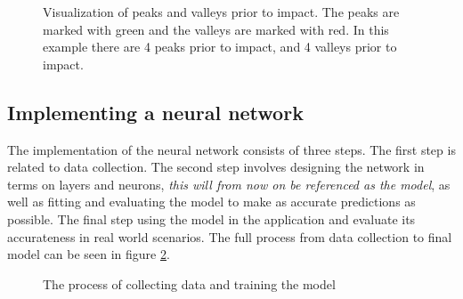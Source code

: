 \documentclass[12pt, a4paper, onecolumn]{article}
\begin{document}
	\begin{figure}[H]
		\centering
		\caption{Visualization of peaks and valleys prior to impact. The peaks are marked with green and the valleys are marked with red. In this example there are 4 peaks prior to impact, and 4 valleys prior to impact.}%
		\label{fig:fall-data-peaks-and-valleys}%
	\end{figure}
	
	\subsection{Implementing a neural network}
	The implementation of the neural network consists of three steps. The first step is related to data collection. The second step involves designing the network in terms on layers and neurons, \textit{this will from now on be referenced as the model}, as well as fitting and evaluating the model to make as accurate predictions as possible. The final step using the model in the application and evaluate its accurateness in real world scenarios. The full process from data collection to final model can be seen in figure \ref{fig:training-model}.
	
	\begin{figure}[H]
		\centering
		\caption{The process of collecting data and training the model}%
		\label{fig:training-model}%
	\end{figure}
	
\end{document}
